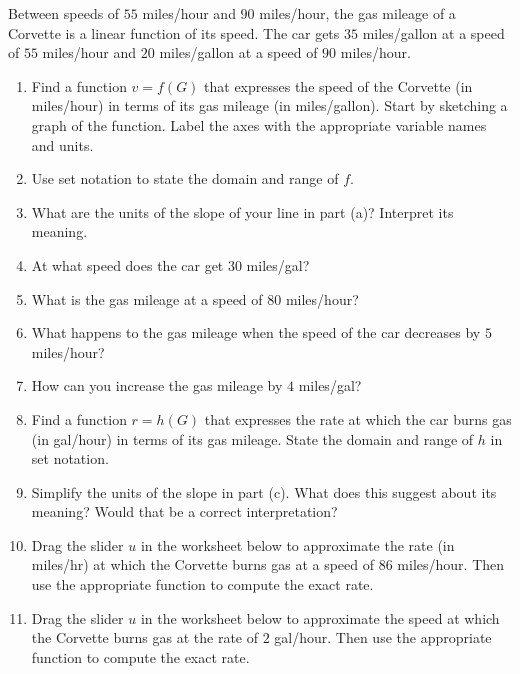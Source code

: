 \documentclass{ximera}
\begin{document}
\begin{question}  \label{Qefltktl4gg}
Between speeds of $55$ miles/hour and $90$ miles/hour, the gas mileage of a Corvette is a linear function of its speed. The car gets $35$ miles/gallon at a speed of $55$ miles/hour and $20$ miles/gallon at a speed of $90$ miles/hour.

\begin{enumerate}

\item Find a function $v=f(G)$ that expresses the speed of the Corvette (in miles/hour) in terms of its gas mileage (in miles/gallon). Start by sketching a graph of the function. Label the axes with the appropriate variable names and units.

\item Use set notation to state the domain and range of $f$.

\item What are the units of the slope of your line in part (a)? Interpret its meaning.

\item At what speed does the car get $30$ miles/gal?

\item What is the gas mileage at a speed of $80$  miles/hour?

\item What happens to the gas mileage when the speed of the car decreases by $5$ miles/hour?

\item How can you increase the gas mileage by $4$ miles/gal?

\item Find a function $r=h(G)$ that expresses the rate at which the car burns gas (in gal/hour) in terms of its gas mileage. State the domain and range of $h$ in set notation.

\item Simplify the units of the slope in part (c). What does this suggest about its meaning? Would that be a correct interpretation?

\item Drag the slider $u$ in the worksheet below to approximate the rate (in miles/hr) at which the Corvette burns gas at a speed of $86$ miles/hour. Then use the appropriate function to compute the exact rate.

\item Drag the slider $u$ in the worksheet below to approximate the speed at which the Corvette burns gas at the rate of $2$ gal/hour. Then use the appropriate function to compute the exact rate.


\end{enumerate}
\end{question}
\end{document}
